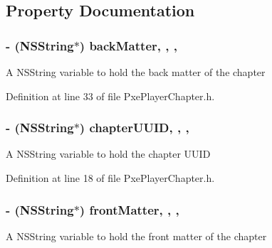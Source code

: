 \subsection{Property Documentation}
\hypertarget{interface_pxe_player_chapter_aa544fdd4d275d2c0730fa62e732cee47}{
\subsubsection[{back\-Matter}]{\setlength{\rightskip}{0pt plus 5cm}-\/ (N\-S\-String$\ast$) back\-Matter\hspace{0.3cm}{\ttfamily [read]}, {\ttfamily [write]}, {\ttfamily [nonatomic]}, {\ttfamily [strong]}}}\label{interface_pxe_player_chapter_aa544fdd4d275d2c0730fa62e732cee47}
A N\-S\-String variable to hold the back matter of the chapter 

Definition at line 33 of file Pxe\-Player\-Chapter.\-h.

\hypertarget{interface_pxe_player_chapter_a188d94563ab2dba44cda27ee4a83adba}{
\subsubsection[{chapter\-U\-U\-I\-D}]{\setlength{\rightskip}{0pt plus 5cm}-\/ (N\-S\-String$\ast$) chapter\-U\-U\-I\-D\hspace{0.3cm}{\ttfamily [read]}, {\ttfamily [write]}, {\ttfamily [nonatomic]}, {\ttfamily [strong]}}}\label{interface_pxe_player_chapter_a188d94563ab2dba44cda27ee4a83adba}
A N\-S\-String variable to hold the chapter U\-U\-I\-D 

Definition at line 18 of file Pxe\-Player\-Chapter.\-h.

\hypertarget{interface_pxe_player_chapter_ada01cfc06b789fdec327cd7e97ad7d60}{
\subsubsection[{front\-Matter}]{\setlength{\rightskip}{0pt plus 5cm}-\/ (N\-S\-String$\ast$) front\-Matter\hspace{0.3cm}{\ttfamily [read]}, {\ttfamily [write]}, {\ttfamily [nonatomic]}, {\ttfamily [strong]}}}\label{interface_pxe_player_chapter_ada01cfc06b789fdec327cd7e97ad7d60}
A N\-S\-String variable to hold the front matter of the chapter 

